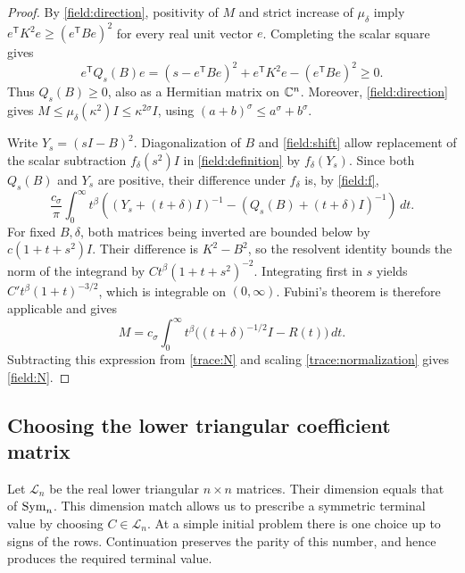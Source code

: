 \begin{proof}
By \eqref{field:direction}, positivity of $M$ and strict increase
of $\mu_\delta$ imply
$e^{\mathsf T}K^2e\geq(e^{\mathsf T}Be)^2$ for every real unit
vector $e$.  Completing the scalar square gives
\[
 e^{\mathsf T}Q_s(B)e=(s-e^{\mathsf T}Be)^2
                +e^{\mathsf T}K^2e-(e^{\mathsf T}Be)^2\geq0.
\]
Thus $Q_s(B)\geq0$, also as a Hermitian matrix on $\mathbb C^n$.
Moreover, \eqref{field:direction} gives
$M\leq\mu_\delta(\kappa^2)I\leq\kappa^{2\sigma}I$, using
$(a+b)^\sigma\leq a^\sigma+b^\sigma$.

Write $Y_s=(sI-B)^2$.  Diagonalization of $B$ and
\eqref{field:shift} allow replacement of the scalar subtraction
$f_\delta(s^2)I$ in \eqref{field:definition} by $f_\delta(Y_s)$.
Since both $Q_s(B)$ and $Y_s$ are positive, their difference under
$f_\delta$ is, by \eqref{field:f},
\[
 \frac{c_\sigma}{\pi}\int_0^\infty t^\beta
 \left((Y_s+(t+\delta)I)^{-1}
          -(Q_s(B)+(t+\delta)I)^{-1}\right)\,dt.
\]
For fixed $B,\delta$, both matrices being inverted are bounded
below by $c(1+t+s^2)I$.  Their difference is $K^2-B^2$, so the
resolvent identity bounds the norm of the integrand by
$C t^\beta(1+t+s^2)^{-2}$.  Integrating first in $s$ yields
$C't^\beta(1+t)^{-3/2}$, which is integrable on $(0,\infty)$.
Fubini's theorem is therefore applicable and gives
\[
 M=c_\sigma\int_0^\infty t^\beta
        \bigl((t+\delta)^{-1/2}I-R(t)\bigr)\,dt.
\]
Subtracting this expression from \eqref{trace:N} and scaling
\eqref{trace:normalization} gives \eqref{field:N}.
\end{proof}

\subsection{Choosing the lower triangular coefficient matrix}

Let $\mathcal L_n$ be the real lower triangular $n\times n$
matrices.  Their dimension equals that of $\operatorname{Sym}_n$.  This dimension
match allows us to prescribe a symmetric terminal value by choosing
$C\in\mathcal L_n$.  At a simple initial problem there is one choice
up to signs of the rows.  Continuation preserves the parity of this
number, and hence produces the required terminal value.

